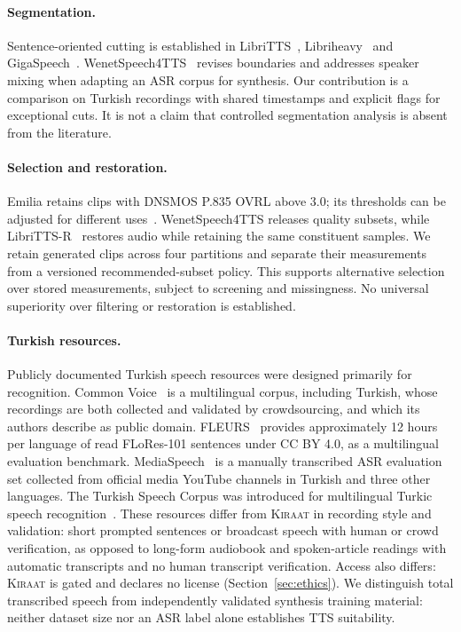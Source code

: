 \documentclass[11pt,a4paper]{article}
\begin{document}
\paragraph{Segmentation.}
Sentence-oriented cutting is established in LibriTTS~\cite{libritts},
Libriheavy~\cite{libriheavy} and GigaSpeech~\cite{gigaspeech}.
WenetSpeech4TTS~\cite{wenetspeech4tts} revises boundaries and addresses
speaker mixing when adapting an ASR corpus for synthesis. Our contribution
is a comparison on Turkish recordings with shared timestamps and explicit
flags for exceptional cuts. It is not a claim that controlled segmentation
analysis is absent from the literature.

\paragraph{Selection and restoration.}
Emilia retains clips with DNSMOS P.835 OVRL above 3.0; its thresholds can be
adjusted for different uses~\cite{emilia}. WenetSpeech4TTS releases quality
subsets, while LibriTTS-R~\cite{librittsr} restores audio while retaining the
same constituent samples. We retain generated clips across four partitions
and separate their measurements from a versioned recommended-subset policy.
This supports alternative selection over stored measurements, subject to
screening and missingness. No universal superiority over filtering or
restoration is established.

\paragraph{Turkish resources.}
Publicly documented Turkish speech resources were designed primarily for
recognition. Common Voice~\cite{commonvoice} is a multilingual corpus, including
Turkish, whose recordings are both collected and validated by crowdsourcing,
and which its authors describe as public domain. FLEURS~\cite{fleurs} provides
approximately 12 hours per language of read FLoRes-101 sentences under
CC BY 4.0, as a multilingual evaluation benchmark. MediaSpeech~\cite{mediaspeech}
is a manually transcribed ASR evaluation set collected from official media
YouTube channels in Turkish and three other languages. The Turkish Speech
Corpus was introduced for multilingual Turkic speech recognition~\cite{turkicasr}.
These resources differ from \textsc{Kiraat} in recording style and validation:
short prompted sentences or broadcast speech with human or crowd
verification, as opposed to long-form audiobook and spoken-article readings
with automatic transcripts and no human transcript verification. Access also
differs: \textsc{Kiraat} is gated and declares no license (Section~\ref{sec:ethics}).
We distinguish total transcribed speech from independently validated
synthesis training material: neither dataset size nor an ASR label alone
establishes TTS suitability.
\end{document}

